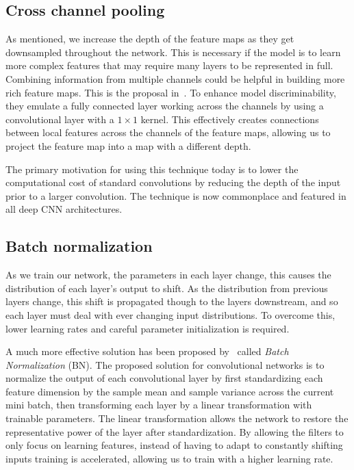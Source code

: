 \subsection{Cross channel pooling}

As mentioned, we increase the depth of the feature maps as they get downsampled throughout the network.
This is necessary if the model is to learn more complex features that may require many layers to be represented in full.
Combining information from multiple channels could be helpful in building more rich feature maps.
This is the proposal in~\cite{lin2014network}.
To enhance model discriminability, they emulate a fully connected layer working across the channels by using a convolutional layer with a \(1\times 1\) kernel.
This effectively creates connections between local features across the channels of the feature maps, allowing us to project the feature map into a map with a different depth.

The primary motivation for using this technique today is to lower the computational cost of standard convolutions by reducing the depth of the input prior to a larger convolution.
The technique is now commonplace and featured in all deep CNN architectures.

\subsection{Batch normalization}
As we train our network, the parameters in each layer change, this causes the distribution of each layer’s output to shift.
As the distribution from previous layers change, this shift is propagated though to the layers downstream, and so each layer must deal with ever changing input distributions.
To overcome this, lower learning rates and careful parameter initialization is required. 

A much more effective solution has been proposed by~\cite{ioffe2015batch} called \textit{Batch Normalization} (BN).
The proposed solution for convolutional networks is to normalize the output of each convolutional layer by first standardizing each feature dimension by the sample mean and sample variance across the current mini batch, then transforming each layer by a linear transformation with trainable parameters.
The linear transformation allows the network to restore the representative power of the layer after standardization.
By allowing the filters to only focus on learning features, instead of having to adapt to constantly shifting inputs training is accelerated, allowing us to train with a higher learning rate.

